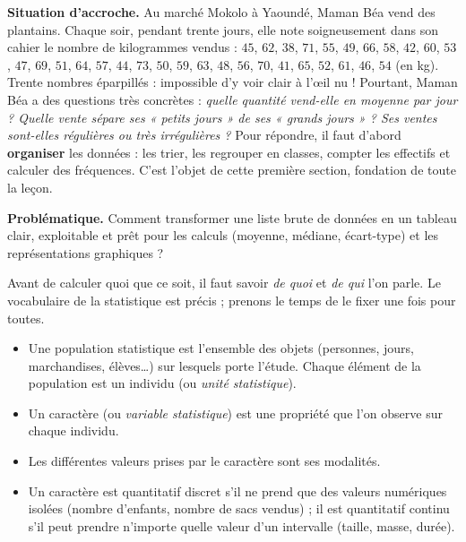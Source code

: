 \documentclass[11pt]{article}
\newcommand{\cle}[1]{{\popxbold\color{popdark}#1}}
\newcounter{popsec}
\newcounter{popsub}
\newcommand{\courssub}[1]{%
  \stepcounter{popsub}%
  \par\vspace{9pt}\noindent{\popxbold\fontsize{11.5}{13}\selectfont\color{popink}{\color{poporange}\thepopsec.\thepopsub}\hspace{6pt}#1}\par\nopagebreak\vspace{4pt}
}
\begin{document}
\textbf{Situation d'accroche.} Au marché Mokolo à Yaoundé, Maman Béa vend des plantains. Chaque soir, pendant trente jours, elle note soigneusement dans son cahier le nombre de kilogrammes vendus : $45$, $62$, $38$, $71$, $55$, $49$, $66$, $58$, $42$, $60$, $53$, $47$, $69$, $51$, $64$, $57$, $44$, $73$, $50$, $59$, $63$, $48$, $56$, $70$, $41$, $65$, $52$, $61$, $46$, $54$ (en kg). Trente nombres éparpillés : impossible d'y voir clair à l'œil nu ! Pourtant, Maman Béa a des questions très concrètes : \emph{quelle quantité vend-elle en moyenne par jour ? Quelle vente sépare ses « petits jours » de ses « grands jours » ? Ses ventes sont-elles régulières ou très irrégulières ?} Pour répondre, il faut d'abord \textbf{organiser} les données : les trier, les regrouper en classes, compter les effectifs et calculer des fréquences. C'est l'objet de cette première section, fondation de toute la leçon.

\textbf{Problématique.} Comment transformer une liste brute de données en un tableau clair, exploitable et prêt pour les calculs (moyenne, médiane, écart-type) et les représentations graphiques ?

\courssub{Population, caractère et modalités}

Avant de calculer quoi que ce soit, il faut savoir \emph{de quoi} et \emph{de qui} l'on parle. Le vocabulaire de la statistique est précis ; prenons le temps de le fixer une fois pour toutes.

\begin{definition}
\begin{itemize}
\item Une \cle{population statistique} est l'ensemble des objets (personnes, jours, marchandises, élèves\ldots) sur lesquels porte l'étude. Chaque élément de la population est un \cle{individu} (ou \emph{unité statistique}).
\item Un \cle{caractère} (ou \emph{variable statistique}) est une propriété que l'on observe sur chaque individu.
\item Les différentes valeurs prises par le caractère sont ses \cle{modalités}.
\item Un caractère est \cle{quantitatif discret} s'il ne prend que des valeurs numériques isolées (nombre d'enfants, nombre de sacs vendus) ; il est \cle{quantitatif continu} s'il peut prendre n'importe quelle valeur d'un intervalle (taille, masse, durée).
\end{itemize}
\end{definition}
\end{document}
